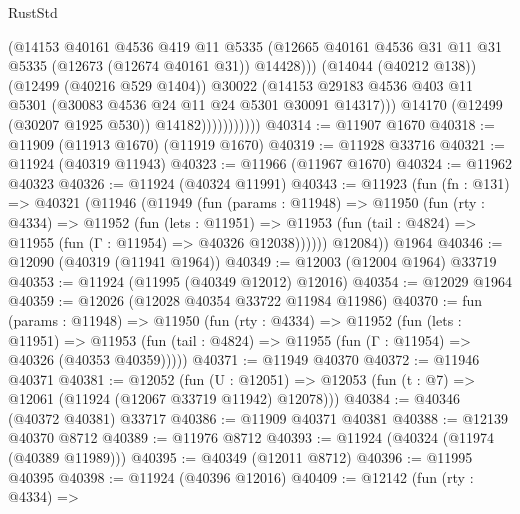\begin{lexlean}{RustStd}
\begin{coremodule}
                              (@14153
                                @40161
                                @4536
                                @419
                                @11
                                @5335
                                (@12665
                                  @40161
                                  @4536
                                  @31
                                  @11
                                  @31
                                  @5335
                                  (@12673 (@12674 @40161 @31))
                                  @14428)))
                            (@14044 (@40212 @138))
                            (@12499 (@40216 @529 @1404))
                            @30022
                            (@14153
                              @29183
                              @4536
                              @403
                              @11
                              @5301
                              (@30083 @4536 @24 @11 @24 @5301 @30091 @14317)))
                          @14170
                          (@12499 (@30207 @1925 @530))
                          @14182)))))))))))
@40314 := @11907 @1670
@40318 := @11909 (@11913 @1670) (@11919 @1670)
@40319 := @11928 @33716
@40321 := @11924 (@40319 @11943)
@40323 := @11966 (@11967 @1670)
@40324 := @11962 @40323
@40326 := @11924 (@40324 @11991)
@40343 := @11923
    (fun (fn : @131) =>
    @40321
      (@11946
        (@11949
          (fun (params : @11948) =>
          @11950
            (fun (rty : @4334) =>
            @11952
              (fun (lets : @11951) =>
              @11953 (fun (tail : @4824) => @11955 (fun (Γ : @11954) => @40326 @12038))))))
        @12084))
    @1964
@40346 := @12090 (@40319 (@11941 @1964))
@40349 := @12003 (@12004 @1964) @33719
@40353 := @11924 (@11995 (@40349 @12012) @12016)
@40354 := @12029 @1964
@40359 := @12026 (@12028 @40354 @33722 @11984 @11986)
@40370 := fun (params : @11948) =>
  @11950
    (fun (rty : @4334) =>
    @11952
      (fun (lets : @11951) =>
      @11953 (fun (tail : @4824) => @11955 (fun (Γ : @11954) => @40326 (@40353 @40359)))))
@40371 := @11949 @40370
@40372 := @11946 @40371
@40381 := @12052
    (fun (U : @12051) => @12053 (fun (t : @7) => @12061 (@11924 (@12067 @33719 @11942) @12078)))
@40384 := @40346 (@40372 @40381) @33717
@40386 := @11909 @40371 @40381
@40388 := @12139 @40370 @8712
@40389 := @11976 @8712
@40393 := @11924 (@40324 (@11974 (@40389 @11989)))
@40395 := @40349 (@12011 @8712)
@40396 := @11995 @40395
@40398 := @11924 (@40396 @12016)
@40409 := @12142
    (fun (rty : @4334) =>

\end{coremodule}
\end{lexlean}
